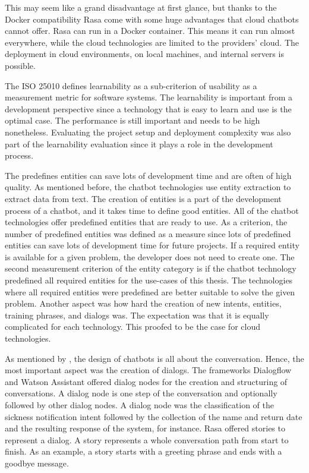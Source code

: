 This may seem like a grand disadvantage at first glance, but thanks to the Docker compatibility Rasa come with some huge advantages that cloud chatbots cannot offer.
Rasa can run in a Docker container.
This means it can run almost everywhere, while the cloud technologies are limited to the providers' cloud.
The deployment in cloud environments, on local machines, and internal servers is possible.

The ISO 25010\cite{iso25010} defines learnability as a sub-criterion of usability as a measurement metric for software systems.
The learnability is important from a development perspective since a technology that is easy to learn and use is the optimal case.
The performance is still important and needs to be high nonetheless.
Evaluating the project setup and deployment complexity was also part of the learnability evaluation since it plays a role in the development process.

The predefines entities can save lots of development time and are often of high quality.
As mentioned before, the chatbot technologies use entity extraction to extract data from text.
The creation of entities is a part of the development process of a chatbot, and it takes time to define good entities.
All of the chatbot technologies offer predefined entities that are ready to use.
As a criterion, the number of predefined entities was defined as a measure since lots of predefined entities can save lots of development time for future projects.
If a required entity is available for a given problem, the developer does not need to create one.
The second measurement criterion of the entity category is if the chatbot technology predefined all required entities for the use-cases of this thesis.
The technologies where all required entities were predefined are better suitable to solve the given problem.
Another aspect was how hard the creation of new intents, entities, training phrases, and dialogs was.
The expectation was that it is equally complicated for each technology. This proofed to be the case for cloud technologies.

As mentioned by \citet{folstad2017chatbots}, the design of chatbots is all about the conversation.
Hence, the most important aspect was the creation of dialogs.
The frameworks Dialogflow and Watson Assistant offered dialog nodes for the creation and structuring of conversations.
A dialog node is one step of the conversation and optionally followed by other dialog nodes.
A dialog node was the classification of the sickness notification intent followed by the collection of the name and return date and the resulting response of the system, for instance.
Rasa offered stories to represent a dialog.
A story represents a whole conversation path from start to finish.
As an example, a story starts with a greeting phrase and ends with a goodbye message.


